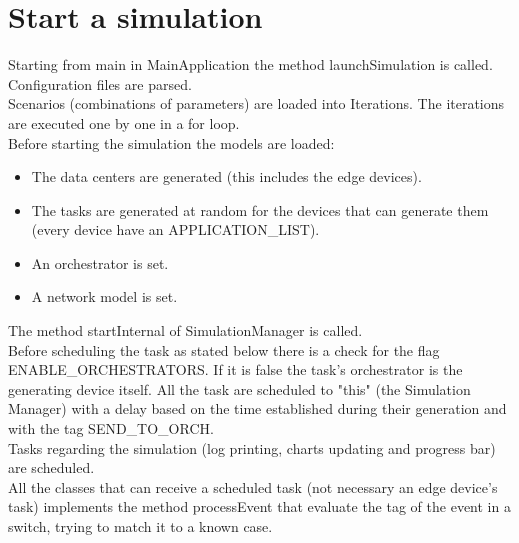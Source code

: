 \documentclass[12pt]{report}
\begin{document}
\section{Start a simulation}
Starting from main in MainApplication the method launchSimulation is called.\\
Configuration files are parsed.\\
Scenarios (combinations of parameters) are loaded into Iterations.
The iterations are executed one by one in a for loop.\\
Before starting the simulation the models are loaded:
\begin{itemize}
	\item The data centers are generated (this includes the edge devices).
	\item The tasks are generated at random for the devices that can generate them (every device have an APPLICATION\_LIST).
	\item An orchestrator is set.
	\item A network model is set.
\end{itemize}
The method startInternal of SimulationManager is called.\\
Before scheduling the task as stated below there is a check for the flag ENABLE\_ORCHESTRATORS. If it is false the task's orchestrator is the generating device itself.
All the task are scheduled to "this" (the Simulation Manager) with a delay based on the time established during their generation and with the tag SEND\_TO\_ORCH.\\
Tasks regarding the simulation (log printing, charts updating and progress bar) are scheduled.\\
All the classes that can receive a scheduled task (not necessary an edge device's task) implements the method processEvent that evaluate the tag of the event in a switch, trying to match it to a known case.
\end{document}

